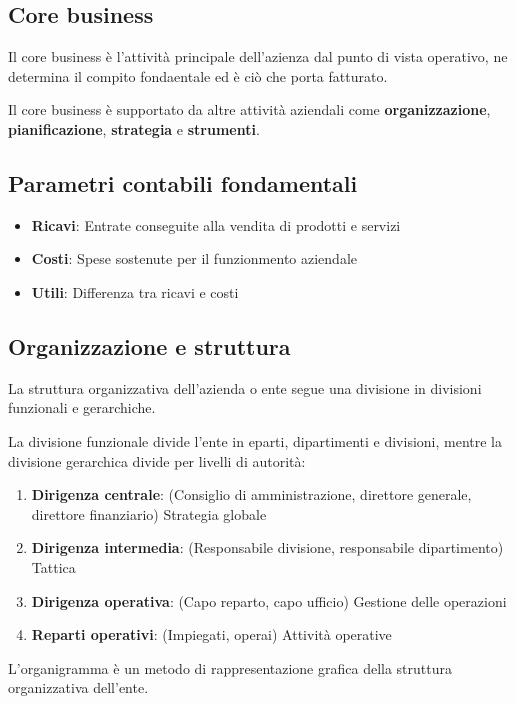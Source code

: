 \subsection{Core business}

Il core business è l'attività principale dell'azienza dal punto di vista operativo,
ne determina il compito fondaentale ed è ciò che porta fatturato.

Il core business è supportato da altre attività aziendali come \textbf{organizzazione},
\textbf{pianificazione}, \textbf{strategia} e \textbf{strumenti}.

\subsection{Parametri contabili fondamentali}

\begin{itemize}
  \item \textbf{Ricavi}: Entrate conseguite alla vendita di prodotti e servizi
  \item \textbf{Costi}: Spese sostenute per il funzionmento aziendale
  \item \textbf{Utili}: Differenza tra ricavi e costi
\end{itemize}


\subsection{Organizzazione e struttura}
La struttura organizzativa dell'azienda o ente segue una divisione in divisioni funzionali e gerarchiche.


La divisione funzionale divide l'ente in eparti, dipartimenti e divisioni, mentre la divisione gerarchica
divide per livelli di autorità:
\begin{enumerate}
  \item \textbf{Dirigenza centrale}: (Consiglio di amministrazione, direttore generale, direttore finanziario) Strategia globale
  \item \textbf{Dirigenza intermedia}: (Responsabile divisione, responsabile dipartimento) Tattica
  \item \textbf{Dirigenza operativa}: (Capo reparto, capo ufficio) Gestione delle operazioni
  \item \textbf{Reparti operativi}: (Impiegati, operai) Attività operative
\end{enumerate}

L'organigramma è un metodo di rappresentazione grafica della struttura organizzativa dell'ente.


